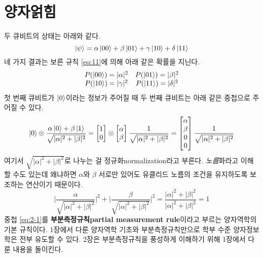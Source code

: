 \documentclass[a4paper,chapter,atbegshi]{oblivoir}
\begin{document}
\chapter{양자얽힘}
두 큐비트의 상태는 아래와 같다. 
\[
  \ket{\psi} = \alpha\ket{00}+\beta\ket{01}+\gamma\ket{10}+\delta\ket{11}
\]
네 가지 결과는 보른 규칙 \ref{eq:11}에 의해 아래 같은 확률을 지닌다. 
\[\begin{matrix}
  P(\ket{00})=|\alpha|^2 & P(\ket{01})=|\beta|^2 \\
  P(\ket{10})=|\gamma|^2 & P(\ket{11})=|\delta|^2
\end{matrix}\]
첫 번째 큐비트가 $\ket{0}$이라는 정보가 주어질 때 두 번째 큐비트는 아래
같은 중첩으로 주어질 수 있다.
\begin{equation}\label{eq:2-1}
  \ket0\otimes\frac{\alpha\ket0+\beta\ket1}{\sqrt{|\alpha|^2+|\beta|^2}}
  = \begin{bmatrix}1\\0\end{bmatrix}\otimes
  \begin{bmatrix}\alpha\\\beta\end{bmatrix}\frac{1}{\sqrt{|\alpha|^2+|\beta|^2}}
  = \begin{bmatrix}\alpha\\\beta\\0\\0\end{bmatrix}\frac{1}{\sqrt{|\alpha|^2+|\beta|^2}}
\end{equation}
여기서 $\sqrt{|\alpha|^2+|\beta|^2}$로 나누는 걸 정규화{\tiny normalization}라고
부른다. \emph{노름}화라고 이해할 수도 있는데 왜냐하면 $\alpha$와 $\beta$ 서로만
있어도 유클리드 노름의 조건을 유지하도록 보조하는 연산이기 때문이다. 
\[
  \Bigg\lvert\frac{\alpha}{\sqrt{|\alpha|^2+|\beta|^2}}\Bigg\rvert^2 +
  \Bigg\lvert\frac{\beta}{\sqrt{|\alpha|^2+|\beta|^2}}\Bigg\rvert^2
  =
  \frac{|\alpha|^2+|\beta|^2}{|\alpha|^2+|\beta|^2}=1
\]
중첩 \ref{eq:2-1}를 \textbf{부분측정규칙\tiny partial measurement rule}이라고
부르는 양자역학의 기본 규칙이다. 1장에서 다룬 양자역학 기초와 부분측정규칙만으로
학부 수준 양자정보학은 전부 유도할 수 있다. 2장은 부분측정규칙을 풍성하게
이해하기 위해 1장에서 다룬 내용을 돌이킨다. 
\end{document}
